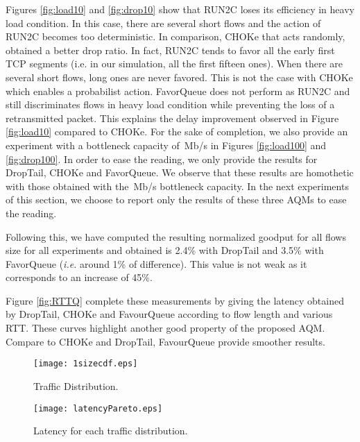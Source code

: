 \documentclass{elsart}
\begin{document}
Figures \ref{fig:load10} and \ref{fig:drop10} show that RUN2C loses its efficiency in heavy load condition. In this case, there are several short flows and the action of RUN2C becomes too deterministic. In comparison, CHOKe that acts randomly, obtained a better drop ratio. 
In fact, RUN2C tends to favor all the early first TCP segments (i.e. in our simulation, all the first fifteen ones). When there are several short flows, long ones are never favored. This is not the case with CHOKe which enables a probabilist action.
FavorQueue does not perform as RUN2C and still discriminates flows in heavy load condition while preventing the loss of a retransmitted packet. This explains the delay improvement observed in Figure \ref{fig:load10} compared to CHOKe.
For the sake of completion, we also provide an experiment with a bottleneck capacity of \,Mb/s in Figures \ref{fig:load100} and \ref{fig:drop100}. In order to ease the reading, we only provide the results for DropTail, CHOKe and FavorQueue. We observe that these results are homothetic with those obtained with the \,Mb/s bottleneck capacity. In the next experiments of this section, we choose to report only the results of these three AQMs to ease the reading.

Following this, we have computed the resulting normalized goodput for all flows size for all experiments and obtained is 2.4\% with DropTail and 3.5\% with FavorQueue (\textit{i.e.} around 1\% of difference). This value is not weak as it corresponds to an increase of 45\%.

Figure \ref{fig:RTTQ} complete these measurements by giving the latency obtained by DropTail, CHOKe and FavourQueue according to flow length and various RTT. These curves highlight another good property of the proposed AQM. Compare to CHOKe and DropTail, FavourQueue provide smoother results. 

\begin{figure}[htb!]
   \begin{minipage}[b]{1.0\columnwidth}
	\centering
	\texttt{[image: 1sizecdf.eps]}
	\caption{Traffic Distribution.}
	\label{fig:size-dist}
   \end{minipage}\hfill

   \begin{minipage}[b]{1.0\columnwidth}   
	\centering
	\texttt{[image: latencyPareto.eps]}
	\caption{Latency for each traffic distribution.}
	\label{fig:lat-dist}
   \end{minipage}
   \label{fig:dist}
\end{figure}
\end{document}
